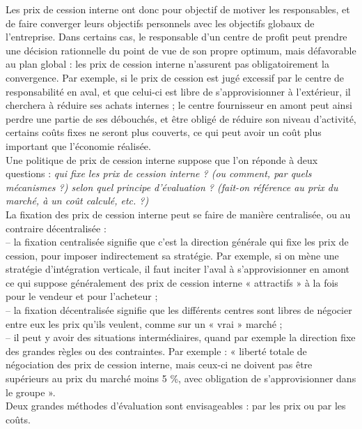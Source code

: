 \documentclass{tufte-handout}
\begin{document}
Les prix de cession interne ont donc pour objectif de motiver les responsables, et de faire converger leurs objectifs personnels avec les objectifs globaux de l’entreprise. Dans certains cas, le responsable d’un centre de profit peut prendre une décision rationnelle du point de vue de son propre optimum, mais défavorable au plan global : les prix de cession interne n’assurent pas obligatoirement la convergence. Par exemple, si le prix de cession est jugé excessif par le centre de responsabilité en aval, et que celui-ci est libre de s’approvisionner à l’extérieur, il cherchera à réduire ses achats internes ; le centre fournisseur en amont peut ainsi perdre une partie de ses débouchés, et être obligé de réduire son niveau d’activité, certains coûts fixes ne seront plus couverts, ce qui peut avoir un coût plus important que l'économie réalisée.\\

Une politique de prix de cession interne suppose que l’on réponde à deux questions : \emph{qui fixe les prix de cession interne ? (ou comment, par quels mécanismes ?) selon quel principe d’évaluation ? (fait-on référence au prix du marché, à un coût calculé, etc. ?)}\\
La fixation des prix de cession interne peut se faire de manière centralisée, ou au contraire décentralisée :\\
– la fixation centralisée signifie que c’est la direction générale qui fixe les prix de cession, pour imposer indirectement sa stratégie. Par exemple, si on mène une stratégie d’intégration verticale, il faut inciter l’aval à s’approvisionner en amont ce qui suppose généralement des prix de cession interne « attractifs » à la fois pour le vendeur et pour l’acheteur ;\\
– la fixation décentralisée signifie que les différents centres sont libres de négocier entre eux les prix qu’ils veulent, comme sur un « vrai » marché ;\\
– il peut y avoir des situations intermédiaires, quand par exemple la direction fixe des grandes règles ou des contraintes. Par exemple : « liberté totale de négociation des prix de cession interne, mais ceux-ci ne doivent pas être supérieurs au prix du marché moins 5 \%, avec obligation de s’approvisionner dans le groupe ».\\

Deux grandes méthodes d’évaluation sont envisageables : par les prix ou par les coûts.\\
\end{document}
